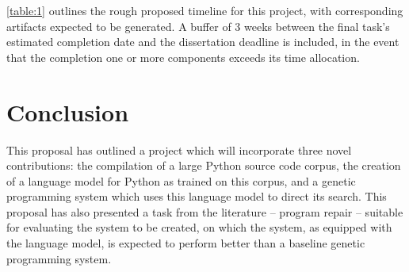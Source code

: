 \documentclass[a4paper,11pt]{proposal}
\begin{document}
\autoref{table:1} outlines the rough proposed timeline for this project, with corresponding artifacts expected to be generated. A buffer of 3 weeks between the final task's estimated completion date and the dissertation deadline is included, in the event that the completion one or more components exceeds its time allocation.

\section{Conclusion}
This proposal has outlined a project which will incorporate three novel contributions: the compilation of a large Python source code corpus, the creation of a language model for Python as trained on this corpus, and a genetic programming system which uses this language model to direct its search. This proposal has also presented a task from the literature -- program repair -- suitable for evaluating the system to be created, on which the system, as equipped with the language model, is expected to perform better than a baseline genetic programming system.


\newpage


\end{document}
